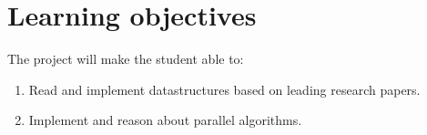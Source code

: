 \documentclass[a4paper, oneside, draft]{memoir}
\begin{document}

\section{Learning objectives}
The project will make the student able to:
\begin{enumerate}
    \item Read and implement datastructures based on leading research papers.
    \item Implement and reason about parallel algorithms.
\end{enumerate}

\end{document}
